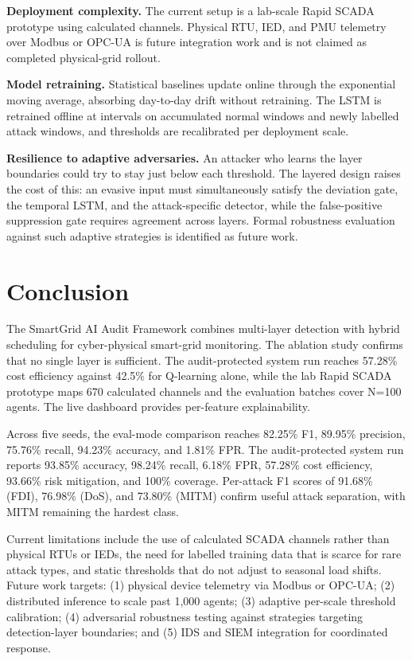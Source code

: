 \documentclass[conference,a4paper]{IEEEtran}
\begin{document}
\textbf{Deployment complexity.} The current setup is a lab-scale Rapid SCADA prototype using calculated channels. Physical RTU, IED, and PMU telemetry over Modbus or OPC-UA is future integration work and is not claimed as completed physical-grid rollout.

\textbf{Model retraining.} Statistical baselines update online through the exponential moving average, absorbing day-to-day drift without retraining. The LSTM is retrained offline at intervals on accumulated normal windows and newly labelled attack windows, and thresholds are recalibrated per deployment scale.

\textbf{Resilience to adaptive adversaries.} An attacker who learns the layer boundaries could try to stay just below each threshold. The layered design raises the cost of this: an evasive input must simultaneously satisfy the deviation gate, the temporal LSTM, and the attack-specific detector, while the false-positive suppression gate requires agreement across layers. Formal robustness evaluation against such adaptive strategies is identified as future work.

\section{Conclusion}

The SmartGrid AI Audit Framework combines multi-layer detection with hybrid scheduling for cyber-physical smart-grid monitoring. The ablation study confirms that no single layer is sufficient. The audit-protected system run reaches 57.28\% cost efficiency against 42.5\% for Q-learning alone, while the lab Rapid SCADA prototype maps 670 calculated channels and the evaluation batches cover N=100 agents. The live dashboard provides per-feature explainability.

Across five seeds, the eval-mode comparison reaches 82.25\% F1, 89.95\% precision, 75.76\% recall, 94.23\% accuracy, and 1.81\% FPR. The audit-protected system run reports 93.85\% accuracy, 98.24\% recall, 6.18\% FPR, 57.28\% cost efficiency, 93.66\% risk mitigation, and 100\% coverage. Per-attack F1 scores of 91.68\% (FDI), 76.98\% (DoS), and 73.80\% (MITM) confirm useful attack separation, with MITM remaining the hardest class.

Current limitations include the use of calculated SCADA channels rather than physical RTUs or IEDs, the need for labelled training data that is scarce for rare attack types, and static thresholds that do not adjust to seasonal load shifts. Future work targets: (1) physical device telemetry via Modbus or OPC-UA; (2) distributed inference to scale past 1,000 agents; (3) adaptive per-scale threshold calibration; (4) adversarial robustness testing against strategies targeting detection-layer boundaries; and (5) IDS and SIEM integration for coordinated response.
\end{document}
